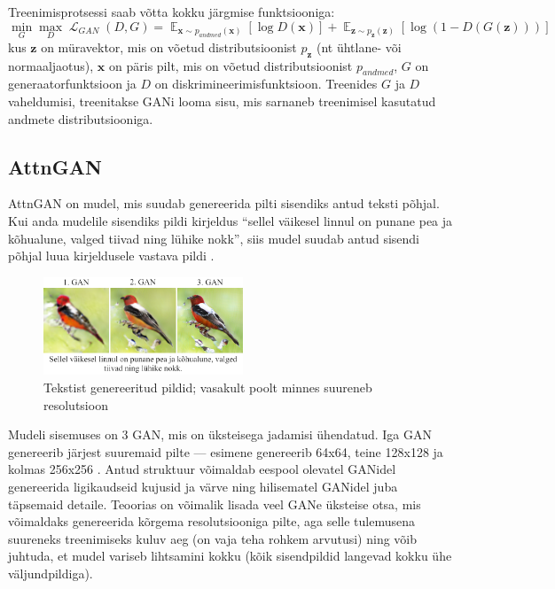 \documentclass{vilgym}
\DeclareMathOperator{\EX}{\mathbb{E}}
\DeclareMathOperator{\loss}{\mathcal{L}}
\begin{document}
	Treenimisprotsessi saab võtta kokku järgmise funktsiooniga:
	\begin{equation} \label{eq:gan}
		\operatorname*{min}_G \operatorname*{max}_D \loss_{GAN}(D,G) = \EX_{\boldsymbol{x}\sim p_{andmed}(\boldsymbol{x})}[\log D(\boldsymbol{x})] + \EX_{\boldsymbol{z}\sim p_{\boldsymbol{z}}(\boldsymbol{z})}[\log(1-D(G(\boldsymbol{z})))]
	\end{equation}
	kus $ \boldsymbol{z} $ on müravektor, mis on võetud distributsioonist $ p_{\boldsymbol{z}} $ (nt ühtlane- või normaaljaotus), $ \boldsymbol{x} $ on päris pilt, mis on võetud distributsioonist $ p_{andmed} $, $ G $ on generaatorfunktsioon ja $ D $ on diskrimineerimisfunktsioon. Treenides $ G $ ja $ D $ vaheldumisi, treenitakse GANi looma sisu, mis sarnaneb treenimisel kasutatud andmete distributsiooniga. \parencite{gan}

	\subsection{AttnGAN}

	AttnGAN on mudel, mis suudab genereerida pilti sisendiks antud teksti põhjal. Kui anda mudelile sisendiks pildi kirjeldus \enquote{sellel väikesel linnul on punane pea ja kõhualune, valged tiivad ning lühike nokk}, siis mudel suudab antud sisendi põhjal luua kirjeldusele vastava pildi .
	
	\begin{figure}
		\includegraphics[width=0.53\textwidth]{images/attngan.png}
		\caption{Tekstist genereeritud pildid; vasakult poolt minnes suureneb resolutsioon}
		\label{fig:attngan}
	\end{figure}

	Mudeli sisemuses on 3 GAN, mis on üksteisega jadamisi ühendatud. Iga GAN genereerib järjest suuremaid pilte --- esimene genereerib 64x64, teine 128x128 ja kolmas 256x256 . Antud struktuur võimaldab eespool olevatel GANidel genereerida ligikaudseid kujusid ja värve ning hilisematel GANidel juba täpsemaid detaile. Teoorias on võimalik lisada veel GANe üksteise otsa, mis võimaldaks genereerida kõrgema resolutsiooniga pilte, aga selle tulemusena suureneks treenimiseks kuluv aeg (on vaja teha rohkem arvutusi) ning võib juhtuda, et mudel variseb lihtsamini kokku (kõik sisendpildid langevad kokku ühe väljundpildiga).
\end{document}
